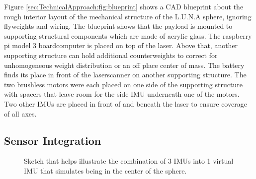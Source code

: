 Figure \ref{sec:TechnicalApproach:fig:blueprint} shows a CAD blueprint about the rough interior layout of the mechanical structure of the L.U.N.A sphere, ignoring flyweights and wiring. The blueprint shows that the payload is mounted to supporting structural components which are made of acrylic glass. The raspberry pi model 3 boardcomputer is placed on top of the laser. Above that, another supporting structure can hold additional counterweights to correct for unhomogeneous weight distribution or an off place center of mass.                                                                                                     
The battery finds its place in front of the laserscanner on another supporting structure. The two brushless motors were each placed on one side of the supporting structure with spacers that leave room for the side IMU underneath one of the motors. Two other IMUs are placed in front of and beneath the laser to ensure coverage of all axes.                                                                                 
                                                                                                                                                                                                                  
\subsection{Sensor Integration}                                                                                                                                                                                   
\label{sec:TechnicalApproach:SensorIntegration}

\begin{figure}                                                                                                                                                                                                    
\centering
\caption{Sketch that helps illustrate the combination of 3 IMUs into 1 virtual IMU that simulates being in the center of the sphere.}                                                                                                                           
\label{sec:SensorIntegration:fig:virtual}                                                                                                                                                                       
\end{figure}                                                                                                                                                                                                      

